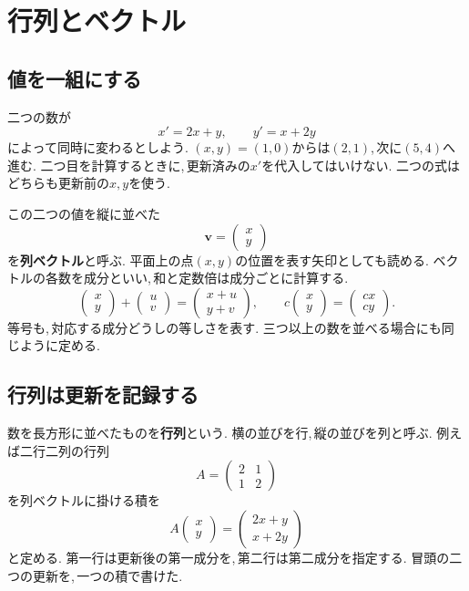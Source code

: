 \section{行列とベクトル}\label{節：行列とベクトル}
\subsection{値を一組にする}

二つの数が
\[
  x'=2x+y,\qquad y'=x+2y
\]
によって同時に変わるとしよう.
$(x,y)=(1,0)$からは$(2,1)$,\,次に$(5,4)$へ進む.
二つ目を計算するときに,\,更新済みの$x'$を代入してはいけない.
二つの式はどちらも更新前の$x,y$を使う.

この二つの値を縦に並べた
\[
  \boldsymbol v=\begin{pmatrix}x\\y\end{pmatrix}
\]
を\textbf{列ベクトル}と呼ぶ.
平面上の点$(x,y)$の位置を表す矢印としても読める.
ベクトルの各数を成分といい,\,和と定数倍は成分ごとに計算する.
\[
 \begin{pmatrix}x\\y\end{pmatrix}
 +\begin{pmatrix}u\\v\end{pmatrix}
 =\begin{pmatrix}x+u\\y+v\end{pmatrix},
 \qquad
 c\begin{pmatrix}x\\y\end{pmatrix}
 =\begin{pmatrix}cx\\cy\end{pmatrix}.
\]
等号も,\,対応する成分どうしの等しさを表す.
三つ以上の数を並べる場合にも同じように定める.

\subsection{行列は更新を記録する}

数を長方形に並べたものを\textbf{行列}という.
横の並びを行,\,縦の並びを列と呼ぶ.
例えば二行二列の行列
\[
 A=\begin{pmatrix}2&1\\1&2\end{pmatrix}
\]
を列ベクトルに掛ける積を
\[
 A\begin{pmatrix}x\\y\end{pmatrix}
 =\begin{pmatrix}2x+y\\x+2y\end{pmatrix}
\]
と定める.
第一行は更新後の第一成分を,\,第二行は第二成分を指定する.
冒頭の二つの更新を,\,一つの積で書けた.

